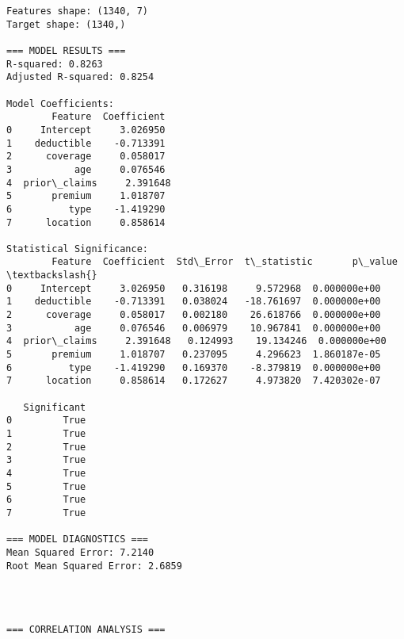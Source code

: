 \documentclass[8pt, twocolumn]{extarticle}
\begin{document}
\begin{Verbatim}[commandchars=\\\{\}]
Features shape: (1340, 7)
Target shape: (1340,)

=== MODEL RESULTS ===
R-squared: 0.8263
Adjusted R-squared: 0.8254

Model Coefficients:
        Feature  Coefficient
0     Intercept     3.026950
1    deductible    -0.713391
2      coverage     0.058017
3           age     0.076546
4  prior\_claims     2.391648
5       premium     1.018707
6          type    -1.419290
7      location     0.858614

Statistical Significance:
        Feature  Coefficient  Std\_Error  t\_statistic       p\_value  \textbackslash{}
0     Intercept     3.026950   0.316198     9.572968  0.000000e+00
1    deductible    -0.713391   0.038024   -18.761697  0.000000e+00
2      coverage     0.058017   0.002180    26.618766  0.000000e+00
3           age     0.076546   0.006979    10.967841  0.000000e+00
4  prior\_claims     2.391648   0.124993    19.134246  0.000000e+00
5       premium     1.018707   0.237095     4.296623  1.860187e-05
6          type    -1.419290   0.169370    -8.379819  0.000000e+00
7      location     0.858614   0.172627     4.973820  7.420302e-07

   Significant
0         True
1         True
2         True
3         True
4         True
5         True
6         True
7         True

=== MODEL DIAGNOSTICS ===
Mean Squared Error: 7.2140
Root Mean Squared Error: 2.6859
    \end{Verbatim}

    \begin{center}
    \end{center}
    { \hspace*{\fill} \\}
    
    \begin{Verbatim}[commandchars=\\\{\}]

=== CORRELATION ANALYSIS ===
    \end{Verbatim}

    \begin{center}
    \end{center}
    { \hspace*{\fill} \\}
    
\end{document}

